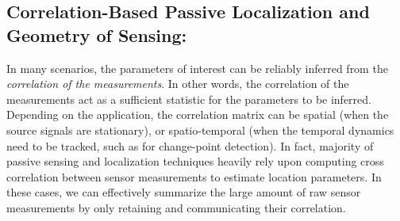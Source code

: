 \subsection{Correlation-Based Passive Localization and Geometry of Sensing:} In many scenarios, the parameters of interest can be reliably inferred from the {\em correlation of the measurements}. In other words, the correlation of the measurements act as a sufficient statistic for the parameters to be inferred. Depending on the application, the correlation matrix can be spatial (when the source signals are stationary), or spatio-temporal (when the temporal dynamics need to be tracked, such as for change-point detection). In fact, majority of passive sensing and localization techniques heavily rely upon computing cross correlation between sensor measurements to estimate location parameters. In these cases, we can effectively summarize the large amount of raw sensor measurements by only retaining and communicating their correlation. 

